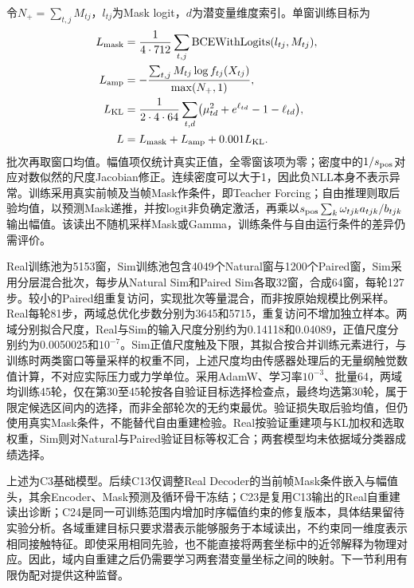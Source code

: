 令$N_+=\sum_{t,j}M_{tj}$，$l_{tj}$为Mask logit，$d$为潜变量维度索引。单窗训练目标为
\begin{equation}
 \begin{aligned}
 L_{\rm mask}&=\frac1{4\cdot712}\sum_{t,j}
 \operatorname{BCEWithLogits}(l_{tj},M_{tj}),\\
 L_{\rm amp}&=-\frac{\sum_{t,j}M_{tj}\log f_{tj}(X_{tj})}{\max(N_+,1)},\\
 L_{\rm KL}&=\frac1{2\cdot4\cdot64}\sum_{t,d}
 \bigl(\mu_{td}^{2}+e^{\ell_{td}}-1-\ell_{td}\bigr),\\
 L&=L_{\rm mask}+L_{\rm amp}+0.001L_{\rm KL}.
 \end{aligned}
 \label{eq:ch05_vae_objective}
\end{equation}
批次再取窗口均值。幅值项仅统计真实正值，全零窗该项为零；密度中的$1/s_{\rm pos}$对应对数似然的尺度Jacobian修正。连续密度可以大于1，因此负NLL本身不表示异常。训练采用真实前帧及当帧Mask作条件，即Teacher Forcing；自由推理则取后验均值，以预测Mask递推，并按logit非负确定激活，再乘以$s_{\rm pos}\sum_k\omega_{tjk}a_{tjk}/b_{tjk}$输出幅值。该读出不随机采样Mask或Gamma，训练条件与自由运行条件的差异仍需评价。

Real训练池为5153窗，Sim训练池包含4049个Natural窗与1200个Paired窗，Sim采用分层混合批次，每步从Natural Sim和Paired Sim各取32窗，合成64窗，每轮127步。较小的Paired组重复访问，实现批次等量混合，而非按原始规模比例采样。Real每轮81步，两域总优化步数分别为3645和5715，重复访问不增加独立样本。两域分别拟合尺度，Real与Sim的输入尺度分别约为0.14118和0.04089，正值尺度分别约为0.0050025和$10^{-7}$。Sim正值尺度触及下限，其拟合按合并训练元素进行，与训练时两类窗口等量采样的权重不同，上述尺度均由传感器处理后的无量纲触觉数值计算，不对应实际压力或力学单位。采用AdamW、学习率$10^{-3}$、批量64，两域均训练45轮，仅在第30至45轮按各自验证目标选择检查点，最终均选第30轮，属于限定候选区间内的选择，而非全部轮次的无约束最优。验证损失取后验均值，但仍使用真实Mask条件，不能替代自由重建检验。Real按验证重建项与KL加权和选取权重，Sim则对Natural与Paired验证目标等权汇合；两套模型均未依据域分类器成绩选择。

上述为C3基础模型。后续C13仅调整Real Decoder的当前帧Mask条件嵌入与幅值头，其余Encoder、Mask预测及循环骨干冻结；C23是复用C13输出的Real自重建读出诊断；C24是同一可训练范围内增加时序幅值约束的修复版本，具体结果留待实验分析。各域重建目标只要求潜表示能够服务于本域读出，不约束同一维度表示相同接触特征。即使采用相同先验，也不能直接将两套坐标中的近邻解释为物理对应。因此，域内自重建之后仍需要学习两套潜变量坐标之间的映射。下一节利用有限伪配对提供这种监督。
